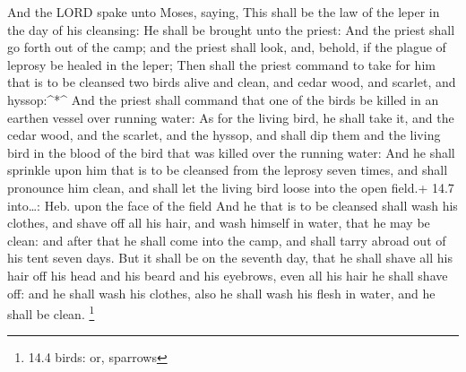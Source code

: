  And the LORD spake unto Moses, saying,  This
shall be the law of the leper in the day of his cleansing: He shall be
brought unto the priest:  And the priest shall go forth out
of the camp; and the priest shall look, and, behold, if the plague of
leprosy be healed in the leper;  Then shall the priest
command to take for him that is to be cleansed two birds alive and
clean, and cedar wood, and scarlet, and hyssop:\^{}*\^{} 
And the priest shall command that one of the birds be killed in an
earthen vessel over running water:  As for the living bird,
he shall take it, and the cedar wood, and the scarlet, and the hyssop,
and shall dip them and the living bird in the blood of the bird that was
killed over the running water:  And he shall sprinkle upon
him that is to be cleansed from the leprosy seven times, and shall
pronounce him clean, and shall let the living bird loose into the open
field.+ 14.7 into\ldots: Heb. upon the face of the field 
And he that is to be cleansed shall wash his clothes, and shave off all
his hair, and wash himself in water, that he may be clean: and after
that he shall come into the camp, and shall tarry abroad out of his tent
seven days.  But it shall be on the seventh day, that he
shall shave all his hair off his head and his beard and his eyebrows,
even all his hair he shall shave off: and he shall wash his clothes,
also he shall wash his flesh in water, and he shall be clean.
\footnote{14.4 birds: or, sparrows}

